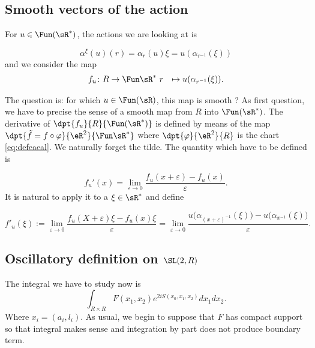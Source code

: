 \subsection{Smooth vectors of the action}

For $u\in \Fun(\sR^*)$, the actions we are looking at is

\[ 
  \alpha^{\xi}(u)(r)=\alpha_r(u)\xi=u(\alpha_{r^{-1}}(\xi))
\]
and we consider the map 
		\begin{equation}
		\begin{aligned}
			f_u \colon R &\to \Fun\sR^*\
			r&\mapsto u(\alpha_{r^{-1}}(\xi)).
		\end{aligned}
	\end{equation}	

 The question is: for which $u\in\Fun(\sR)$, this map is smooth ? As first question, we have to precise the sense of a smooth map from $R$ into $\Fun(\sR^*)$. The derivative of $\dpt{f_u}{R}{\Fun(\sR^*)}$ is defined by means of the map $\dpt{\tilde f=f\circ\varphi}{\eR^2}{\Fun\sR^*}$ where $\dpt{\varphi}{\eR^2}{R}$ is the chart \eqref{eq:defeaeal}. We naturally forget the tilde. The quantity which have to be defined is


\[ 
 f_u'(x)=\lim_{\varepsilon\to 0}\frac{f_u(x+\varepsilon)-f_u(x)}{\varepsilon}. 
\]
It is natural to apply it to a $\xi\in\sR^*$ and define

\begin{equation}
f'_u(\xi):=\lim_{\varepsilon\to 0}\frac{f_u(X+\varepsilon)\xi-f_u(x)\xi}{\varepsilon}
	=\lim_{\varepsilon\to 0}\frac{u\big( \alpha_{(x+\varepsilon)^{-1}}(\xi) \big)-u\big( \alpha_{x^{-1}}(\xi) \big)}{\varepsilon}.
\end{equation}



\subsection{Oscillatory definition on \texorpdfstring{$\SL(2,R)$}{SL2R}}  \label{subsec:Oscdefsl}

The integral we have to study now is
\[ 
  \int_{R\times R} F(x_1,x_2) e^{2iS(x_0,x_1,x_2)}dx_1dx_2.
\]
Where $x_i=(a_i,l_i)$. As usual, we begin to suppose that $F$ has compact support so that integral makes sense and integration by part does not produce boundary term.

